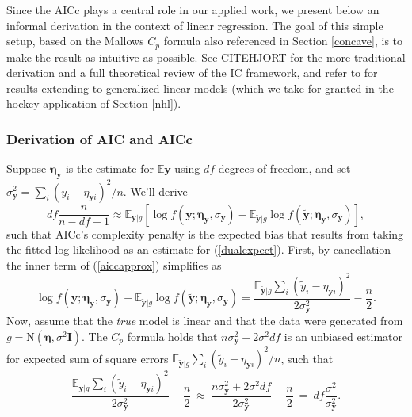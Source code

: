 \documentclass[12pt]{article}
\newcommand{\bs}[1]{\boldsymbol{#1}}
\newcommand{\mr}[1]{\mathrm{#1}}
\newcommand{\bm}[1]{\mathbf{#1}}
\newcommand{\ds}[1]{\mathds{#1}}
\begin{document}
Since the AICc plays a central role in our applied work, we present below an informal derivation in the context of linear regression.  The goal of this simple setup, based on the Mallows $C_p$ formula also referenced in Section \ref{concave}, is to make the result as intuitive as possible.  See CITEHJORT for the more traditional derivation and a full theoretical review of the IC framework, and refer to \citet{flynn_efficiency_2013} for results extending to generalized linear models (which we take for granted in the hockey application of Section \ref{nhl}). 

\subsubsection{Derivation of AIC and AICc}

Suppose $\bs{\eta}_\bm{y}$ is the estimate for $\ds{E}\bm{y}$ using $df$ degrees of freedom, and set $\sigma^2_{\bm{y}} = \sum_i (y_i - \eta_{\bm{y}i})^2/n$.
We'll derive  
\begin{equation}\label{aiccapprox}
df\frac{n}{n-df-1}  \approx \ds{E}_{\bm{y}|g}\left[\log f(\bm{y}; \bs{\eta}_{\bm{y}},\sigma_{\bm{y}}) - \ds{E}_{\bm{\tilde y}|g} \log f(\bm{\tilde y}; \bs{\eta}_{\bm{y}},\sigma_{\bm{y}})
\right],
\end{equation}
such that AICc's complexity penalty is the expected bias that results from taking the fitted log likelihood as an estimate for (\ref{dualexpect}).  First, by cancellation the inner term of (\ref{aiccapprox}) simplifies as 
\begin{equation}
\log f(\bm{y}; \bs{\eta}_{\bm{y}},\sigma_{\bm{y}}) - \ds{E}_{\bm{\tilde y}|g} \log f(\bm{\tilde y}; \bs{\eta}_{\bm{y}},\sigma_{\bm{y}}) = 
\frac{\ds{E}_{\bm{\tilde y}|g} \sum_i (\tilde y_i - \eta_{\bm{y}i})^2}{2 \sigma^2_{\bm{y}}} - \frac{n}{2}.
\end{equation}
Now, assume that the {\it true} model is linear and that the data were generated
from $g = \mr{N}(\bs{\eta}, \sigma^2\bm{I})$.  The \cite{mallows_comments_1973} $C_p$ formula holds that 
$n\sigma^2_{\bm{y}} + 2 \sigma^2 df$ is an unbiased estimator for  expected 
sum of square errors $\ds{E}_{\bm{\tilde y}|g} \sum_i (\tilde y_i - \eta_{\bm{y}i})^2/n$, such that
\begin{equation}
\frac{\ds{E}_{\bm{\tilde y}|g} \sum_i (\tilde y_i - \eta_{\bm{y}i})^2}{2 \sigma^2_{\bm{y}}} - \frac{n}{2} 
 ~\approx~ \frac{n\sigma^2_{\bm{y}} + 2 \sigma^2 df}{2 \sigma^2_{\bm{y}}} - \frac{n}{2}
 ~=~  df\frac{\sigma^2 }{\sigma^2_{\bm{y}}}.
\end{equation}
\end{document}
